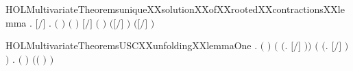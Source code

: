 \begin{SaveVerbatim}{HOLMultivariateTheoremsuniqueXXsolutionXXofXXrootedXXcontractionsXXlemma}
           \HOLSymConst{\HOLTokenForall{}}.
               \ensuremath{[}\ensuremath{/}\ensuremath{]}  \HOLTokenWeakTransBegin\HOLConst{\ensuremath{\tau}}\HOLTokenWeakTransEnd {} \HOLSymConst{\HOLTokenImp{}}
               \HOLSymConst{\HOLTokenExists{}}.
                      \HOLSymConst{\HOLTokenConj{}}  \ensuremath{(} \ensuremath{)} \ensuremath{(} \ensuremath{)} \HOLSymConst{\HOLTokenConj{}}
                     \ensuremath{[}\ensuremath{/}\ensuremath{]}  \HOLSymConst{\HOLTokenConj{}}
                   \ensuremath{(}  \ensuremath{)} \ensuremath{(}\ensuremath{[}\ensuremath{/}\ensuremath{]} \ensuremath{)} \ensuremath{(}\ensuremath{[}\ensuremath{/}\ensuremath{]} \ensuremath{)}
\end{SaveVerbatim}
\newcommand{\HOLMultivariateTheoremsuniqueXXsolutionXXofXXrootedXXcontractionsXXlemma}{\UseVerbatim{HOLMultivariateTheoremsuniqueXXsolutionXXofXXrootedXXcontractionsXXlemma}}
\begin{SaveVerbatim}{HOLMultivariateTheoremsUSCXXunfoldingXXlemmaOne}
\HOLTokenTurnstile{} \HOLSymConst{\HOLTokenForall{}}    .
          \HOLSymConst{\HOLTokenConj{}}  \ensuremath{(} \ensuremath{)}  \HOLSymConst{\HOLTokenConj{}}
            \HOLSymConst{\HOLTokenConj{}}    \HOLSymConst{\HOLTokenConj{}}
       \ensuremath{(} \HOLSymConst{\ensuremath{=}} \ensuremath{(}\HOLTokenLambda{}.  \ensuremath{[}\ensuremath{/}\ensuremath{]} \ensuremath{)}\ensuremath{)} \HOLSymConst{\HOLTokenConj{}} \ensuremath{(} \HOLSymConst{\ensuremath{=}} \ensuremath{(}\HOLTokenLambda{}. \ensuremath{[}\ensuremath{/}\ensuremath{]} \ensuremath{)}\ensuremath{)} \HOLSymConst{\HOLTokenImp{}}
       \HOLSymConst{\HOLTokenForall{}}.  \ensuremath{(} \ensuremath{)} \ensuremath{(}\ensuremath{(} \HOLConst{\HOLTokenCompose}   \ensuremath{)} \ensuremath{)}
\end{SaveVerbatim}
